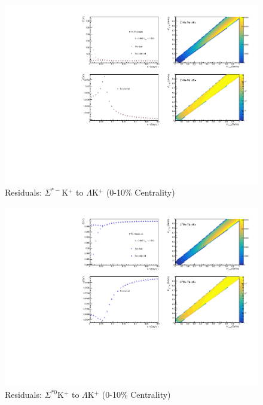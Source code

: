 \documentclass[/home/jesse/Analysis/FemtoAnalysis/AnalysisNotes/AnalysisNoteJBuxton.tex]{subfiles}
\begin{document}
\begin{figure}[h]
  \centering
  \includegraphics[width=\textwidth]{9_AdditionalFigures/Figures/Residuals/LamKchP/Residuals_LamKchP_0010_SigStMKchP_MomResCrctn_NonFlatBgdCrctn_10Res_PrimMaxDecay4fm_UsingXiDataAndCoulombOnly.pdf}
  \caption[Residuals: $\Sigma^{*-}$K$^{+}$ to $\Lambda$K$^{+}$ (0-10\% Centrality)]{Residuals: $\Sigma^{*-}$K$^{+}$ to $\Lambda$K$^{+}$ (0-10\% Centrality)}
  \label{fig:Res_LamKchP_0010_SigStMKchP}
\end{figure}

\begin{figure}[h]
  \centering
  \includegraphics[width=\textwidth]{9_AdditionalFigures/Figures/Residuals/LamKchP/Residuals_LamKchP_0010_SigSt0KchP_MomResCrctn_NonFlatBgdCrctn_10Res_PrimMaxDecay4fm_UsingXiDataAndCoulombOnly.pdf}
  \caption[Residuals: $\Sigma^{*0}$K$^{+}$ to $\Lambda$K$^{+}$ (0-10\% Centrality)]{Residuals: $\Sigma^{*0}$K$^{+}$ to $\Lambda$K$^{+}$ (0-10\% Centrality)}
  \label{fig:Res_LamKchP_0010_SigSt0KchP}
\end{figure}
\end{document}
